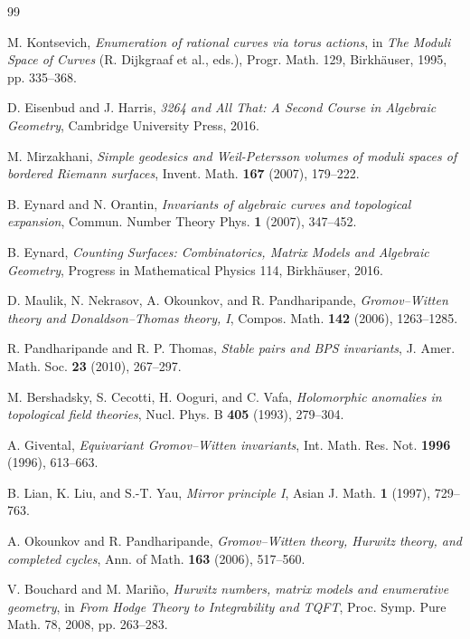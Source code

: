 \begin{thebibliography}{99}

 M. Kontsevich,
\textit{Enumeration of rational curves via torus actions},
in \emph{The Moduli Space of Curves} (R. Dijkgraaf et al., eds.),
Progr. Math. 129, Birkhäuser, 1995, pp. 335--368.

 D. Eisenbud and J. Harris,
\textit{3264 and All That: A Second Course in Algebraic Geometry},
Cambridge University Press, 2016.

 M. Mirzakhani,
\textit{Simple geodesics and Weil-Petersson volumes of moduli spaces of bordered Riemann surfaces},
Invent. Math. \textbf{167} (2007), 179--222.

 B. Eynard and N. Orantin,
\textit{Invariants of algebraic curves and topological expansion},
Commun. Number Theory Phys. \textbf{1} (2007), 347--452.

 B. Eynard,
\textit{Counting Surfaces: Combinatorics, Matrix Models and Algebraic Geometry},
Progress in Mathematical Physics 114, Birkhäuser, 2016.

 D. Maulik, N. Nekrasov, A. Okounkov, and R. Pandharipande,
\textit{Gromov--Witten theory and Donaldson--Thomas theory, I},
Compos. Math. \textbf{142} (2006), 1263--1285.

 R. Pandharipande and R. P. Thomas,
\textit{Stable pairs and BPS invariants},
J. Amer. Math. Soc. \textbf{23} (2010), 267--297.

 M. Bershadsky, S. Cecotti, H. Ooguri, and C. Vafa,
\textit{Holomorphic anomalies in topological field theories},
Nucl. Phys. B \textbf{405} (1993), 279--304.

 A. Givental,
\textit{Equivariant Gromov--Witten invariants},
Int. Math. Res. Not. \textbf{1996} (1996), 613--663.

 B. Lian, K. Liu, and S.-T. Yau,
\textit{Mirror principle I},
Asian J. Math. \textbf{1} (1997), 729--763.

 A. Okounkov and R. Pandharipande,
\textit{Gromov--Witten theory, Hurwitz theory, and completed cycles},
Ann. of Math. \textbf{163} (2006), 517--560.

 V. Bouchard and M. Mariño,
\textit{Hurwitz numbers, matrix models and enumerative geometry},
in \emph{From Hodge Theory to Integrability and TQFT},
Proc. Symp. Pure Math. 78, 2008, pp. 263--283.


\end{thebibliography}
